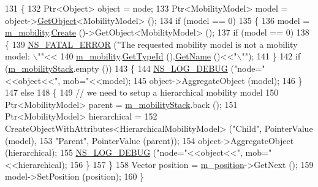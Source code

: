 \begin{DoxyCode}
131 \{
132   Ptr<Object> \textcolor{keywordtype}{object} = node;
133   Ptr<MobilityModel> model = \textcolor{keywordtype}{object}->\hyperlink{classns3_1_1Object_a13e18c00017096c8381eb651d5bd0783}{GetObject}<MobilityModel> ();
134   \textcolor{keywordflow}{if} (model == 0)
135     \{
136       model = \hyperlink{classns3_1_1MobilityHelper_a4ef940485a2e5b840d1552bc5331c404}{m\_mobility}.\hyperlink{classns3_1_1ObjectFactory_a18152e93f0a6fe184ed7300cb31e9896}{Create} ()->GetObject<MobilityModel> ();
137       \textcolor{keywordflow}{if} (model == 0)
138         \{
139           \hyperlink{group__fatal_ga5131d5e3f75d7d4cbfd706ac456fdc85}{NS\_FATAL\_ERROR} (\textcolor{stringliteral}{"The requested mobility model is not a mobility model: \(\backslash\)""}<< 
140                           \hyperlink{classns3_1_1MobilityHelper_a4ef940485a2e5b840d1552bc5331c404}{m\_mobility}.\hyperlink{classns3_1_1ObjectFactory_a14baab41e2bd984a3eee543b8d8086d7}{GetTypeId} ().\hyperlink{classns3_1_1TypeId_aa3c41c79ae428b3cb396a9c6bb3ef314}{GetName} ()<<\textcolor{stringliteral}{"\(\backslash\)""});
141         \}
142       \textcolor{keywordflow}{if} (\hyperlink{classns3_1_1MobilityHelper_afa6de1206985c5c37610f02de43b10d2}{m\_mobilityStack}.empty ())
143         \{
144           \hyperlink{group__logging_ga413f1886406d49f59a6a0a89b77b4d0a}{NS\_LOG\_DEBUG} (\textcolor{stringliteral}{"node="}<<\textcolor{keywordtype}{object}<<\textcolor{stringliteral}{", mob="}<<model);
145           \textcolor{keywordtype}{object}->AggregateObject (model);
146         \}
147       \textcolor{keywordflow}{else}
148         \{
149           \textcolor{comment}{// we need to setup a hierarchical mobility model}
150           Ptr<MobilityModel> parent = \hyperlink{classns3_1_1MobilityHelper_afa6de1206985c5c37610f02de43b10d2}{m\_mobilityStack}.back ();
151           Ptr<MobilityModel> hierarchical = 
152             CreateObjectWithAttributes<HierarchicalMobilityModel> (\textcolor{stringliteral}{"Child"}, PointerValue (model),
153                                                                    \textcolor{stringliteral}{"Parent"}, PointerValue (parent));
154           \textcolor{keywordtype}{object}->AggregateObject (hierarchical);
155           \hyperlink{group__logging_ga413f1886406d49f59a6a0a89b77b4d0a}{NS\_LOG\_DEBUG} (\textcolor{stringliteral}{"node="}<<\textcolor{keywordtype}{object}<<\textcolor{stringliteral}{", mob="}<<hierarchical);
156         \}
157     \}
158   Vector position = \hyperlink{classns3_1_1MobilityHelper_a93a974a210f2c818b2649fca2d24d264}{m\_position}->GetNext ();
159   model->SetPosition (position);
160 \}
\end{DoxyCode}


